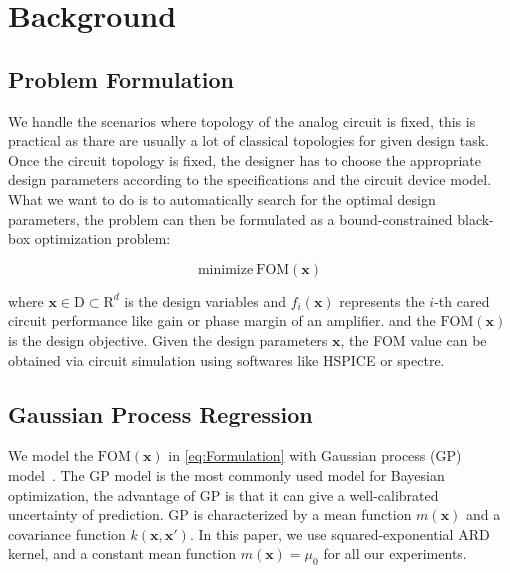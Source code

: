 \section{Background}


\subsection{Problem Formulation}


We handle the scenarios where topology of the analog circuit is fixed, this is
practical as thare are usually a lot of classical topologies for given design
task. Once the circuit topology is fixed, the designer has to choose the
appropriate design parameters according to the specifications and the circuit
device model. What we want to do is to automatically search for the optimal
design parameters, the problem can then be formulated as a bound-constrained
black-box optimization problem:

\begin{equation}
    \label{eq:Formulation}
    \text{minimize}~\mathrm{FOM}(\bm{x})
\end{equation}

where $\bm{x} \in \textrm{D} \subset \textrm{R}^d$ is the design variables
and $f_i(\bm{x})$ represents the $i$-th cared circuit performance like gain
or phase margin of an amplifier. and the $\mathrm{FOM}(\bm{x})$ is the
design objective. Given the design parameters $\bm{x}$, the FOM value can be
obtained via circuit simulation using softwares like HSPICE or spectre.


\subsection{Gaussian Process Regression}

We model the $\mathrm{FOM}(\bm{x})$ in \eqref{eq:Formulation} with Gaussian
process (GP) model~\cite{GPML}. The GP model is the most commonly used model
for Bayesian optimization, the advantage of GP is that it can give a
well-calibrated uncertainty of prediction. GP is characterized by a mean
function $m(\bm{x})$ and a covariance function $k(\bm{x}, \bm{x'})$. In this
paper, we use squared-exponential ARD kernel, and a constant mean function
$m(\bm{x}) = \mu_0$ for all our experiments.

